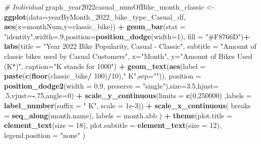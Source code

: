 \documentclass[
]{article}
\newenvironment{Shaded}{\begin{snugshade}}{\end{snugshade}}
\newcommand{\AttributeTok}[1]{\textcolor[rgb]{0.13,0.29,0.53}{#1}}
\newcommand{\CommentTok}[1]{\textcolor[rgb]{0.56,0.35,0.01}{\textit{#1}}}
\newcommand{\DecValTok}[1]{\textcolor[rgb]{0.00,0.00,0.81}{#1}}
\newcommand{\FloatTok}[1]{\textcolor[rgb]{0.00,0.00,0.81}{#1}}
\newcommand{\FunctionTok}[1]{\textcolor[rgb]{0.13,0.29,0.53}{\textbf{#1}}}
\newcommand{\NormalTok}[1]{#1}
\newcommand{\OtherTok}[1]{\textcolor[rgb]{0.56,0.35,0.01}{#1}}
\newcommand{\SpecialCharTok}[1]{\textcolor[rgb]{0.81,0.36,0.00}{\textbf{#1}}}
\newcommand{\StringTok}[1]{\textcolor[rgb]{0.31,0.60,0.02}{#1}}
\begin{document}
\begin{Shaded}
\begin{Highlighting}[]
\CommentTok{\# Individual}
\NormalTok{graph\_year2022casual\_numOfBike\_month\_classic }\OtherTok{\textless{}{-}} \FunctionTok{ggplot}\NormalTok{(}\AttributeTok{data=}\NormalTok{yearByMonth\_2022\_bike\_type\_Casual\_df, }\FunctionTok{aes}\NormalTok{(}\AttributeTok{x=}\NormalTok{monthNum,}\AttributeTok{y=}\NormalTok{classic\_bike)) }\SpecialCharTok{+}
  \FunctionTok{geom\_bar}\NormalTok{(}\AttributeTok{stat =} \StringTok{"identity"}\NormalTok{,}\AttributeTok{width=}\NormalTok{.}\DecValTok{9}\NormalTok{,}\AttributeTok{position=}\FunctionTok{position\_dodge}\NormalTok{(}\AttributeTok{width=}\DecValTok{1}\NormalTok{), }\AttributeTok{fill =} \StringTok{"\#F8766D"}\NormalTok{)}\SpecialCharTok{+}
  \FunctionTok{labs}\NormalTok{(}\AttributeTok{title =} \StringTok{"Year 2022 Bike Popularity, Casual {-} Classic"}\NormalTok{,}
       \AttributeTok{subtitle =} \StringTok{"Amount of classic bikes used by Casual Customers"}\NormalTok{,}
       \AttributeTok{x=}\StringTok{"Month"}\NormalTok{,}
       \AttributeTok{y=}\StringTok{"Amount of Bikes Used (K*)"}\NormalTok{,}
       \AttributeTok{caption=}\StringTok{"K stands for 1000"}\NormalTok{) }\SpecialCharTok{+}
  \FunctionTok{geom\_text}\NormalTok{(}\FunctionTok{aes}\NormalTok{(}\AttributeTok{label =} \FunctionTok{paste}\NormalTok{(}\FunctionTok{c}\NormalTok{(}\FunctionTok{floor}\NormalTok{(classic\_bike}\SpecialCharTok{/} \DecValTok{100}\NormalTok{)}\SpecialCharTok{/}\DecValTok{10}\NormalTok{),}\StringTok{" K"}\NormalTok{,}\AttributeTok{sep=}\StringTok{""}\NormalTok{)),}
            \AttributeTok{position =} \FunctionTok{position\_dodge2}\NormalTok{(}\AttributeTok{width =} \FloatTok{0.9}\NormalTok{, }\AttributeTok{preserve =} \StringTok{"single"}\NormalTok{),}\AttributeTok{size=}\FloatTok{3.5}\NormalTok{,}\AttributeTok{hjust=}\NormalTok{ .}\DecValTok{5}\NormalTok{,}\AttributeTok{vjust=}\SpecialCharTok{{-}}\NormalTok{.}\DecValTok{75}\NormalTok{,}\AttributeTok{angle=}\DecValTok{0}\NormalTok{) }\SpecialCharTok{+}
  \FunctionTok{scale\_y\_continuous}\NormalTok{(}\AttributeTok{limits =} \FunctionTok{c}\NormalTok{(}\DecValTok{0}\NormalTok{,}\DecValTok{250000}\NormalTok{) ,}\AttributeTok{labels =} \FunctionTok{label\_number}\NormalTok{(}\AttributeTok{suffix =} \StringTok{" K"}\NormalTok{, }\AttributeTok{scale =} \FloatTok{1e{-}3}\NormalTok{)) }\SpecialCharTok{+}
  \FunctionTok{scale\_x\_continuous}\NormalTok{(}
    \AttributeTok{breaks =} \FunctionTok{seq\_along}\NormalTok{(month.name), }
    \AttributeTok{labels =}\NormalTok{ month.abb}
\NormalTok{  ) }\SpecialCharTok{+}
  \FunctionTok{theme}\NormalTok{(}\AttributeTok{plot.title =} \FunctionTok{element\_text}\NormalTok{(}\AttributeTok{size =} \DecValTok{18}\NormalTok{),}
        \AttributeTok{plot.subtitle =} \FunctionTok{element\_text}\NormalTok{(}\AttributeTok{size =} \DecValTok{12}\NormalTok{),}
        \AttributeTok{legend.position =} \StringTok{"none"}
\NormalTok{  ) }


\end{Highlighting}
\end{Shaded}
\end{document}

